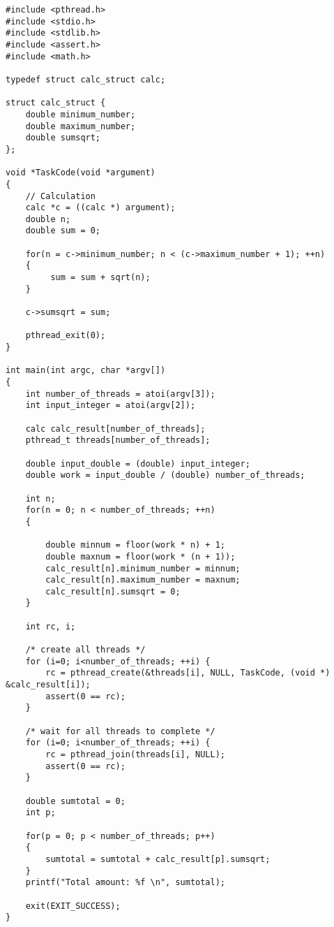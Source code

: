 \begin{lstlisting}
#include <pthread.h>
#include <stdio.h>
#include <stdlib.h>
#include <assert.h>
#include <math.h>

typedef struct calc_struct calc;

struct calc_struct {
	double minimum_number;
	double maximum_number;
	double sumsqrt;
};

void *TaskCode(void *argument)
{
	// Calculation
	calc *c = ((calc *) argument);
	double n;
	double sum = 0;
	
	for(n = c->minimum_number; n < (c->maximum_number + 1); ++n)
	{
		 sum = sum + sqrt(n);
	}
	
	c->sumsqrt = sum;
	
	pthread_exit(0);
}

int main(int argc, char *argv[])
{
	int number_of_threads = atoi(argv[3]);
	int input_integer = atoi(argv[2]);

	calc calc_result[number_of_threads];
	pthread_t threads[number_of_threads];

	double input_double = (double) input_integer;
	double work = input_double / (double) number_of_threads;	

	int n;
	for(n = 0; n < number_of_threads; ++n)
	{
		
		double minnum = floor(work * n) + 1;
		double maxnum = floor(work * (n + 1));
		calc_result[n].minimum_number = minnum;
		calc_result[n].maximum_number = maxnum;
		calc_result[n].sumsqrt = 0;	
	}

	int rc, i;

	/* create all threads */
	for (i=0; i<number_of_threads; ++i) {
		rc = pthread_create(&threads[i], NULL, TaskCode, (void *) &calc_result[i]);
		assert(0 == rc);
	}
	
	/* wait for all threads to complete */
	for (i=0; i<number_of_threads; ++i) {
		rc = pthread_join(threads[i], NULL);
		assert(0 == rc);
	}

	double sumtotal = 0;
	int p;

	for(p = 0; p < number_of_threads; p++)
	{
		sumtotal = sumtotal + calc_result[p].sumsqrt;
	}
	printf("Total amount: %f \n", sumtotal);
	
	exit(EXIT_SUCCESS);
}

\end{lstlisting}